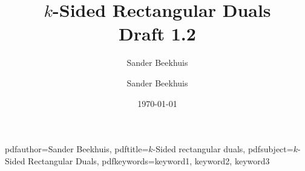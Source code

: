 





\title{$k$-Sided Rectangular Duals \\ \normalsize Draft 1.2}
\author{Sander Beekhuis}
\date{\today} %


%
%
\newcommand{\shortdoctitle}{$k$-Sided rectangular duals}
\newcommand{\doctitle}{$k$-Sided Rectangular Duals}
\newcommand{\docsubtitle}{Some catching subtitle}

\newcommand{\me}{Sander Beekhuis}
\newcommand{\keywords}{keyword1, keyword2, keyword3}
\newcommand{\version}{Version Draft 1.3}
\newcommand{\monthYear}{Feb 2017}

\newcommand{\firstCommitteeMember}{Your First Committee Member}
\newcommand{\secondCommitteeMember}{Your Second Committee Member, usually the daily supervisor}
\newcommand{\thirdCommitteeMember}{Your Third Committee Member, usually the external member}

\author{\me}

%
%
\hypersetup
{
    pdfauthor={\me},
    pdftitle={\shortdoctitle},
    pdfsubject={\doctitle},
    pdfkeywords={\keywords}
}







\normalsize

\newpage
{}









\newpage


\newpage
\thispagestyle{plain}

\tableofcontents

